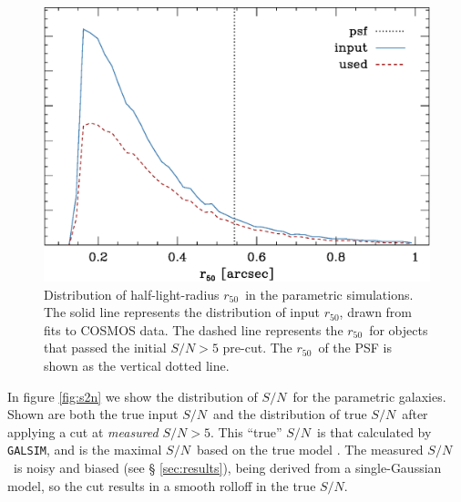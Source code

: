 \documentclass[iop]{emulateapj}
\newcommand{\snr}{$S/N$}
\newcommand{\hlr}{$r_{50}$}
\newcommand{\galsim}{\texttt{GALSIM}}
\begin{document}
\begin{figure}
    \centering
    \includegraphics[width=\columnwidth]{run-bdj03mcal02-r50.eps}

    \caption{Distribution of half-light-radius \hlr\ in the parametric simulations.
        The solid line represents the distribution of input \hlr, drawn from fits
        to COSMOS data.  The dashed line represents the \hlr\ for objects that passed
		the initial $S/N > 5$ pre-cut.  The \hlr\ of the PSF is shown as the vertical dotted
        line.}

\label{fig:psimhlrcompare}
\end{figure}

In figure \ref{fig:s2n} we show the distribution of \snr\ for the parametric
galaxies.   Shown are both the true input \snr\ and the distribution of true
\snr\ after applying a cut at {\it measured} \snr$ > 5$.  This ``true'' \snr\
is that calculated by \galsim, and is the maximal \snr\ based on the true
model \citep{Jarvis2016}.  The measured \snr\ is noisy and biased (see \S
\ref{sec:results}), being derived from a single-Gaussian model, so the cut
results in a smooth rolloff in the true \snr.
\end{document}
